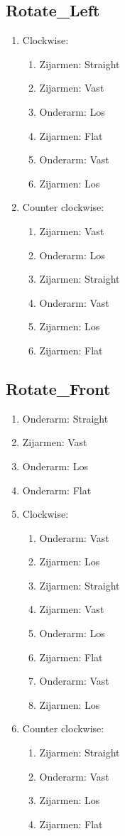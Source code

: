 \subsection{Rotate\_Left}

\begin{enumerate}
	\item Clockwise:
	\begin{enumerate}
		\item Zijarmen: Straight
		\item Zijarmen: Vast
		\item Onderarm: Los
		\item Zijarmen: Flat
		\item Onderarm: Vast
		\item Zijarmen: Los
	\end{enumerate}
	\item Counter clockwise:
	\begin{enumerate}
		\item Zijarmen: Vast
		\item Onderarm: Los
		\item Zijarmen: Straight
		\item Onderarm: Vast
		\item Zijarmen: Los
		\item Zijarmen: Flat
	\end{enumerate}
\end{enumerate}
\newpage

\subsection{Rotate\_Front}

\begin{enumerate}
	\item Onderarm: Straight
	\item Zijarmen: Vast
	\item Onderarm: Los
	\item Onderarm: Flat
	\item Clockwise:
	\begin{enumerate}
		\item Onderarm: Vast
		\item Zijarmen: Los
		\item Zijarmen: Straight
		\item Zijarmen: Vast
		\item Onderarm: Los
		\item Zijarmen: Flat
		\item Onderarm: Vast
		\item Zijarmen: Los
	\end{enumerate}
	\item Counter clockwise:
	\begin{enumerate}
		\item Zijarmen: Straight
		\item Onderarm: Vast
		\item Zijarmen: Los
		\item Zijarmen: Flat
	\end{enumerate}
\end{enumerate}
